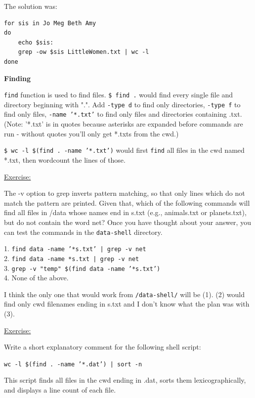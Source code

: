 \documentclass[12pt]{article}
\begin{document}
\begin{addmargin}[1cm]{0cm}
The solution was:
\vspace{-0.5em}\begin{verbatim}
for sis in Jo Meg Beth Amy
do
	echo $sis:
	grep -ow $sis LittleWomen.txt | wc -l
done
\end{verbatim}\end{addmargin}

\textbf{Finding}

\texttt{find} function is used to find files. \texttt{\$ find .} would find every single file and directory beginning with ".". Add \texttt{-type d} to find only directories, \texttt{-type f} to find only files, \texttt{-name '*.txt'} to find only files and directories containing .txt. (Note: '*.txt' is in quotes because asterisks are expanded before commands are run - without quotes you'll only get *.txts from the cwd.)

\texttt{\$ wc -l \$(find . -name '*.txt')} would first \texttt{find} all files in the cwd named *.txt, then wordcount the lines of those.

\begin{addmargin}[1cm]{0cm}
\color{gray}
\underline{Exercise:}

The -v option to grep inverts pattern matching, so that only lines which do not match the pattern are printed. Given that, which of the following commands will find all files in /data whose names end in s.txt (e.g., animals.txt or planets.txt), but do not contain the word net? Once you have thought about your answer, you can test the commands in the \texttt{data-shell} directory.

1. \texttt{find data -name '*s.txt' | grep -v net}
\\2. \texttt{find data -name *s.txt | grep -v net}
\\3. \texttt{grep -v "temp" \$(find data -name '*s.txt')}
\\4. None of the above.

\color{black}\vspace{0.5em}
I think the only one that would work from \texttt{/data-shell/} will be (1). (2) would find only cwd filenames ending in s.txt and I don't know what the plan was with (3).
\end{addmargin}

\begin{addmargin}[1cm]{0cm}
\color{gray}
\underline{Exercise:}

Write a short explanatory comment for the following shell script:

\texttt{wc -l \$(find . -name '*.dat') | sort -n}

\color{black}\vspace{0.5em}
This script finds all files in the cwd ending in .dat, sorts them lexicographically, and displays a line count of each file.
\end{addmargin}
\end{document}
